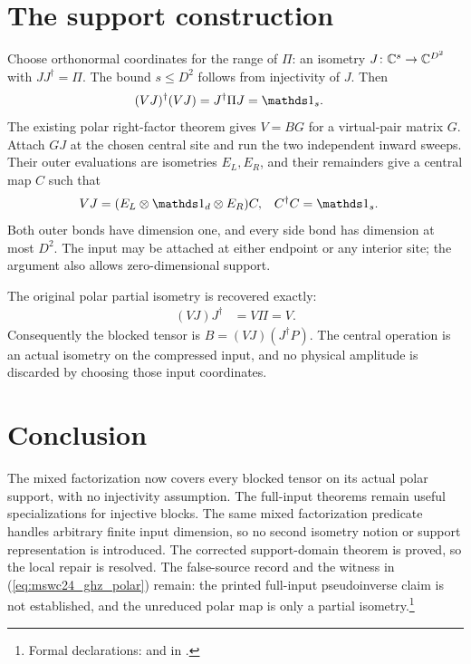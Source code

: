 \documentclass{article}
\begin{document}
\section{The support construction}
Choose orthonormal coordinates for the range of $\Pi$: an isometry
$J\colon\mathbb{C}^s\to\mathbb{C}^{D^2}$ with $JJ^\dagger=\Pi$.
The bound $s\le D^2$ follows from injectivity of $J$. Then
\begin{align}
    (VJ)^\dagger(VJ) & =J^\dagger\Pi J=\Id_s.
    \label{eq:mswc24_support_isometry}
\end{align}
The existing polar right-factor theorem gives $V=BG$ for a virtual-pair
matrix $G$. Attach $GJ$ at the chosen central site and run the two
independent inward sweeps. Their outer evaluations are isometries
$E_L,E_R$, and their remainders give a central map $C$ such that
\begin{align}
    VJ & =(E_L\otimes\Id_d\otimes E_R)C, & C^\dagger C & =\Id_s.
    \label{eq:mswc24_mixed_support}
\end{align}
Both outer bonds have dimension one, and every side bond has dimension
at most $D^2$. The input may be attached at either endpoint or any
interior site; the argument also allows zero-dimensional support.

The original polar partial isometry is recovered exactly:
\begin{align}
    (VJ)J^\dagger & =V\Pi=V.
    \label{eq:mswc24_support_reconstruction}
\end{align}
Consequently the blocked tensor is $B=(VJ)(J^\dagger P)$. The central
operation is an actual isometry on the compressed input, and no physical
amplitude is discarded by choosing those input coordinates.

\section{Conclusion}
The mixed factorization now covers every blocked tensor on its actual
polar support, with no injectivity assumption. The full-input theorems
remain useful specializations for injective blocks. The same mixed
factorization predicate handles arbitrary finite input dimension, so
no second isometry notion or support representation is introduced.
The corrected support-domain theorem is proved, so the local repair is
resolved. The false-source record and the witness in
(\ref{eq:mswc24_ghz_polar}) remain: the printed full-input pseudoinverse
claim is not established, and the unreduced polar map is only a partial
isometry.\footnote{Formal
    declarations: 
    and  in
    .}
\end{document}
